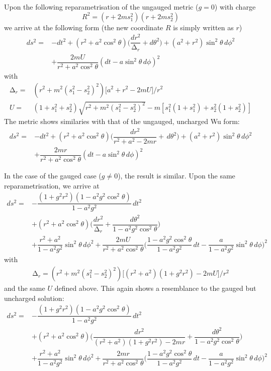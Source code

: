 \begin{prop}
	Upon the following reparametrisation of the ungauged metric ($g=0$) with charge
	\[{R^2=(r+2ms_1^2)(r+2ms_2^2)}\tag{2}\]
	we arrive at the following form (the new coordinate $R$ is simply written as $r$)
\[
\begin{align*}
	ds^2=&-dt^2+(r^2+a^2\cos ^2\theta )\Big(\dfrac{dr^2}{\mathrm{\Delta }_{r}}+d\theta ^2\Big)+(a^2+r^2)\sin ^2\theta \,d\phi ^2\\
	&+\dfrac{2mU}{r^2+a^2\cos ^2\theta }(dt-a\sin ^2\theta \,d\phi )^2
\end{align*}
	\tag{3}
\]
with
\[
\begin{align*}
	\mathrm{\Delta }_{r}=&(r^2+m^2(s_1^2-s_2^2)^2)\Big[a^2+r^2-2mU\Big]/r^2\\U=&(1+s_1^2+s_2^2)\sqrt{r^2+m^2(s_1^2-s_2^2)^2}-m[s_1^2(1+s_1^2)+s_2^2(1+s_2^2)]	
\end{align*}
	\tag{4}
\]
The metric shows similaries with that of the ungauged, uncharged Wu form:
\[
\begin{align*}
	ds^2=	&-dt^2+(r^2+a^2\cos ^2\theta )\Big(\dfrac{dr^2}{r^2+a^2-2mr}+\,d\theta ^2\Big)+(a^2+r^2)\sin ^2\theta \,d\phi ^2\\&+\dfrac{2mr}{r^2+a^2\cos ^2\theta }(dt-a\sin ^2\theta \,d\phi )^2
\end{align*}
	\tag{5}
\]

\end{prop}
\vspace{2ex}
\begin{prop}
In the case of the gauged case ($g\ne 0$), the result is similar. Upon the same reparametrisation, we arrive at
\[
\begin{align*}
	ds^2=&-\dfrac{(1+g^2r^2)(1-a^2g^2\cos ^2\theta )}{1-a^2g^2}\,dt^2\\&+(r^2+a^2\cos ^2\theta )\Big(\dfrac{dr^2}{\mathrm{\Delta }_{r}}+\dfrac{d\theta ^2}{1-a^2g^2\cos ^2\theta }\Big)\\&+\dfrac{r^2+a^2}{1-a^2g^2}\sin ^2\theta \,d\phi ^2+\dfrac{2mU}{r^2+a^2\cos ^2\theta }\Big(\dfrac{1-a^2g^2\cos ^2\theta }{1-a^2g^2}\,dt-\dfrac{a}{1-a^2g^2}\sin ^2\theta \,d\phi \Big)^2
\end{align*}
	\tag{6}
\]
with
\[
\begin{align*}
	\mathrm{\Delta }_{r}=(r^2+m^2(s_1^2-s_2^2)^2)\Big[(r^2+a^2)(1+g^2r^2)-2mU\Big]/r^2
\end{align*}
	\tag{7}
\]
and the same $U$ defined above. This again shows a resemblance to the gauged but uncharged solution:
\[
\begin{align*}
	ds^2=&-\dfrac{(1+g^2r^2)(1-a^2g^2\cos ^2\theta )}{1-a^2g^2}\,dt^2\\&+(r^2+a^2\cos ^2\theta )\Big(\dfrac{dr^2}{(r^2+a^2)(1+g^2r^2)-2mr}+\dfrac{d\theta ^2}{1-a^2g^2\cos ^2\theta }\Big)\\
	&+\dfrac{r^2+a^2}{1-a^2g^2}\sin ^2\theta \,d\phi ^2+\dfrac{2mr}{r^2+a^2\cos ^2\theta }\Big(\dfrac{1-a^2g^2\cos ^2\theta }{1-a^2g^2}\,dt-\dfrac{a}{1-a^2g^2}\sin ^2\theta \,d\phi \Big)^2
\end{align*}
	\tag{8}
\]
\end{prop}
\vspace{2ex}

